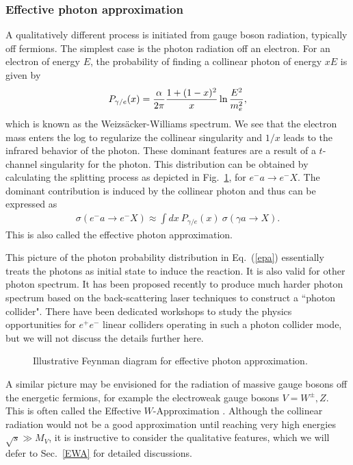 \documentclass[12pt,prd,aps,floats,preprintnumbers,preprint,superscriptaddress,floatfix,nofootinbib]{revtex4}
\def\epem{e^+e^-}
\def\bea{\begin{eqnarray}}
\def\eea{\end{eqnarray}}
\begin{document}
\subsubsection{Effective photon approximation}
\label{WW}

A qualitatively different process is initiated from gauge boson radiation,
typically off fermions.  
The simplest case is the photon radiation off an electron. For an electron
of energy $E$, the probability of finding a collinear photon of energy $xE$
is given by 
\bea
P_{\gamma/e}(x)  = \frac{\alpha}{ 2\pi}{ 1+(1-x)^2\over  x} \ln{E^2\over m^2_e},
\label{eq:WW}
\eea
which is known as the Weizs\"acker-Williams spectrum. We see that the
electron mass enters the log to regularize the collinear singularity and $1/x$
leads to the infrared behavior of the photon. 
These dominant features  are a result of a $t$-channel singularity
for the photon. 
This distribution can be obtained by calculating the splitting process
as depicted in Fig.~\ref{fig:ea}, for $e^- a\to e^- X$. 
The dominant contribution is induced by the collinear photon
and thus can be expressed as
\bea
\sigma(e^-a\to e^-X) \approx \int dx\  P_{\gamma/e}(x)\  \sigma(\gamma a\to X).
\label{epa}
\eea
This is also called the effective photon approximation.

This picture of the photon probability distribution  in Eq.~(\ref{epa}) 
essentially treats the photons as initial state to induce the reaction. 
It is also valid for other photon spectrum.
It has been proposed recently to produce much harder photon spectrum
based on the back-scattering laser techniques \cite{gamma} to
construct a ``photon collider". There have been dedicated workshops to
study the physics opportunities for $\epem$ linear colliders operating
in such a photon collider mode, but we will not discuss the details further here. 

\begin{center}
\begin{figure}[tb]
\hskip 1.2cm
\caption{Illustrative Feynman diagram for effective photon approximation.
\label{fig:ea}}
\end{figure}
\end{center}

A similar picture may be envisioned for the radiation of massive gauge
bosons off the energetic fermions, for example the electroweak gauge bosons
$V=W^\pm,Z$. This is often called the Effective $W$-Approximation \cite{sally,gordy}.
Although the collinear radiation would not be
a good approximation until reaching very high energies $\sqrt s\gg M_V$,
it is instructive to consider the qualitative features, which we will defer 
to Sec.~\ref{EWA} for detailed discussions.
\end{document}

